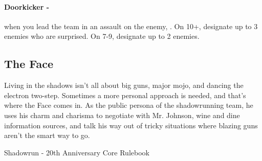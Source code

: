 \paragraph{Doorkicker -} when you lead the team in an assault on the enemy, . On 10+, designate up to 3 enemies who are surprised. On 7-9, designate up to 2 enemies.



\clearpage
\subsection{The Face}
\epigraph{Living in the shadows isn’t all about big guns, major mojo, and dancing the electron two-step. Sometimes a more personal approach is needed, and that’s where the Face comes in. As the public persona of the shadowrunning team, he uses his charm and charisma to negotiate with Mr. Johnson, wine and dine information sources, and talk his way out of tricky situations where blazing guns aren’t the smart way to go.}{Shadowrun - 20th Anniversary Core Rulebook}

